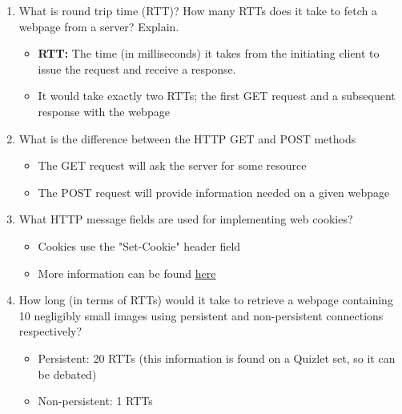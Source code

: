 \documentclass{article}
\begin{document}
\begin{enumerate}
\item What is round trip time (RTT)? How many RTTs does it take to fetch a webpage from a server? Explain.

\begin{itemize}
\item \textbf{RTT:} The time (in milliseconds) it takes from the initiating client to issue the request and receive a response.
\item It would take exactly two RTTs; the first GET request and a subsequent response with the webpage
\end{itemize}

\item What is the difference between the HTTP GET and POST methods
\begin{itemize}
\item The GET request will ask the server for some resource
\item The POST request will provide information needed on a given webpage
\end{itemize}

\item What HTTP message fields are used for implementing web cookies?
\begin{itemize}
\item Cookies use the "Set-Cookie" header field
\item More information can be found \href{https://developer.mozilla.org/en-US/docs/Web/HTTP/Cookies}{\underline{here}}
\end{itemize}

\item How long (in terms of RTTs) would it take to retrieve a webpage containing 10 negligibly small images using persistent and non-persistent connections respectively?

\begin{itemize}
\item Persistent: 20 RTTs (this information is found on a Quizlet set, so it can be debated)
\item Non-persistent: 1 RTTs
\end{itemize}


\end{enumerate}
\end{document}
